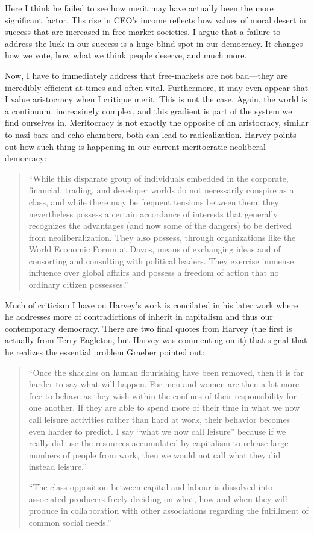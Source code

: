 \documentclass[12pt,a4paper]{article}
\begin{document}
Here I think he failed to see how merit may have actually been the more significant factor. Ths rise in CEO's income reflects how values of moral desert in success that are increased in free-market societies. I argue that a failure to address the luck in our success is a huge blind-spot in our democracy. It changes how we vote, how what we think people deserve, and much more. 

Now, I have to immediately address that free-markets are not bad---they are incredibly efficient at times and often vital. Furthermore, it may even appear that I value aristocracy when I critique merit. This is not the case. Again, the world is a continuum, increasingly complex, and this gradient is part of the system we find ourselves in. Meritocracy is not exactly the opposite of an aristocracy, similar to nazi bars and echo chambers, both can lead to radicalization. Harvey points out how such thing is happening in our current meritocratic neoliberal democracy:
\begin{quote}\color{G-Moon}
   ``While this disparate group of individuals embedded in the 
corporate, financial, trading, and developer worlds do not 
necessarily conspire as a class, and while there may be frequent 
tensions between them, they nevertheless possess a certain 
accordance of interests that generally recognizes the 
advantages (and now some of the dangers) to be derived from 
neoliberalization. They also possess, through organizations like 
the World Economic Forum at Davos, means of exchanging 
ideas and of consorting and consulting with political leaders. 
They exercise immense influence over global affairs and possess 
a freedom of action that no ordinary citizen possesses.''~\cite{neo}
\end{quote}
Much of criticism I have on Harvey's work is concilated in his later work where he addresses more of contradictions of inherit in capitalism and thus our contemporary democracy. There are two final quotes from Harvey (the first is actually from Terry Eagleton, but Harvey was commenting on it) that signal that he realizes the essential problem Graeber pointed out:
\begin{quote}\color{G-Moon}
   ``Once the shackles on human flourishing have been removed, then it is far harder to say what will happen. For men and women are then a lot more free to behave as they wish within the confines of their responsibility for one another. If they are able to spend more of their time in what we now call leisure activities rather than hard at work, their behavior becomes even harder to predict. I say “what we now call leisure” because if we really did use the resources accumulated by capitalism to release large numbers of people from work, then we would not call what they did instead leisure.''~\cite{neo}


   ``The class opposition between capital and labour is dissolved into
associated producers freely deciding on what, how and when they will
produce in collaboration with other associations regarding the
fulfillment of common social needs.''~\cite{con}
\end{quote}
\end{document}
